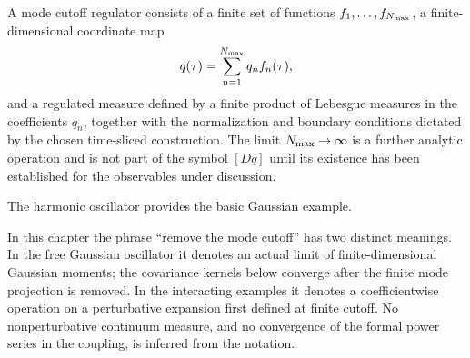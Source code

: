 \begin{center}
\end{center}

\begin{definition}
\label{def:mode-cutoff-regulator-qm}
A mode cutoff regulator consists of a finite set of functions
\(f_1,\ldots,f_{N_{\rm max}}\), a finite-dimensional coordinate map
\[
  q(\tau)=\sum_{n=1}^{N_{\rm max}}q_nf_n(\tau),
\]
and a regulated measure defined by a finite product of Lebesgue measures in
the coefficients \(q_n\), together with the normalization and boundary
conditions dictated by the chosen time-sliced construction.  The limit
\(N_{\rm max}\to\infty\) is a further analytic operation and is not part of
the symbol \([Dq]\) until its existence has been established for the
observables under discussion.
\end{definition}

The harmonic oscillator provides the basic Gaussian example.

\begin{controlledapproximation}
\label{ctrl:remove-mode-cutoff-ch5}
In this chapter the phrase ``remove the mode cutoff'' has two distinct
meanings.  In the free Gaussian oscillator it denotes an actual limit of
finite-dimensional Gaussian moments; the covariance kernels below converge
after the finite mode projection is removed.  In the interacting examples it
denotes a coefficientwise operation on a perturbative expansion first defined
at finite cutoff.  No nonperturbative continuum measure, and no convergence
of the formal power series in the coupling, is inferred from the notation.
\end{controlledapproximation}

